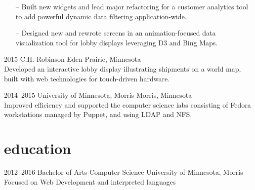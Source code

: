 \documentclass[]{cv-style} %
\begin{document}
\begin{entrylist}
{
\begin{itemize}
    \item[--] Built new widgets and lead major refactoring for a customer analytics tool to add powerful dynamic data filtering application-wide.
    \item[--] Designed new and rewrote screens in an animation-focused data visualization tool for lobby displays leveraging D3 and Bing Maps.
\end{itemize}}


\entry
{2015}
{C.H. Robinson}
{Eden Prairie, Minnesota}
{ \\
Developed an interactive lobby display illustrating shipments on a world map, built with web technologies for touch-driven hardware.}


\entry
{2014--2015}
{University of Minnesota, Morris}
{Morris, Minnesota}
{ \\
Improved efficiency and supported the computer science labs consisting of Fedora workstations managed by Puppet, and using LDAP and NFS.}


\end{entrylist}


\section{education}

\begin{entrylist}


\entry
{2012--2016}
{Bachelor of Arts {\normalfont Computer Science}}
{University of Minnesota, Morris}
{\small{Focused on Web Development and interpreted languages}}


\end{entrylist}
\end{document}
